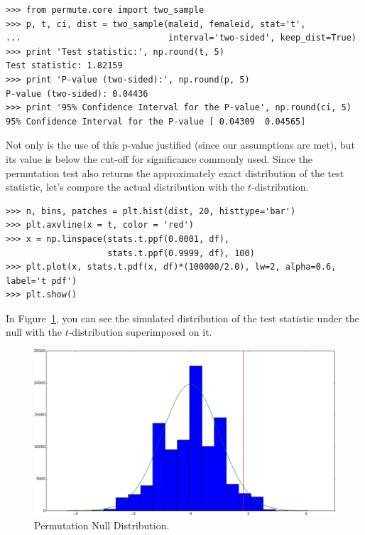 \begin{verbatim}
>>> from permute.core import two_sample
>>> p, t, ci, dist = two_sample(maleid, femaleid, stat='t',
...                             interval='two-sided', keep_dist=True)
>>> print 'Test statistic:', np.round(t, 5)
Test statistic: 1.82159
>>> print 'P-value (two-sided):', np.round(p, 5)
P-value (two-sided): 0.04436
>>> print '95% Confidence Interval for the P-value', np.round(ci, 5)
95% Confidence Interval for the P-value [ 0.04309  0.04565]
\end{verbatim}

Not only is the use of this p-value justified (since our assumptions are
met), but its value is below the cut-off for significance commonly used.
Since the permutation test also returns the approximately exact distribution
of the test statistic, let's compare the actual distribution with the
$t$-distribution.

\begin{verbatim}
>>> n, bins, patches = plt.hist(dist, 20, histtype='bar')
>>> plt.axvline(x = t, color = 'red')
>>> x = np.linspace(stats.t.ppf(0.0001, df),
                    stats.t.ppf(0.9999, df), 100)
>>> plt.plot(x, stats.t.pdf(x, df)*(100000/2.0), lw=2, alpha=0.6, label='t pdf')
>>> plt.show()
\end{verbatim}

In Figure~\ref{fig:figure1}, you can see the simulated distribution of the test
statistic under the null with the $t$-distribution superimposed on it.

\begin{figure}
  \begin{centering}
    \includegraphics[width=.8\textwidth]{fig/figure_1.png}\par
  \end{centering}

  \caption{\label{fig:figure1}Permutation Null Distribution.}

\end{figure}

